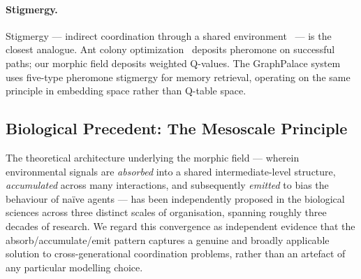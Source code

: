 \documentclass[twoside,11pt]{article}
\begin{document}
\paragraph{Stigmergy.}
Stigmergy --- indirect coordination through a shared
environment~\citep{grasse1959} --- is the closest analogue.  Ant colony
optimization~\citep{dorigo1996} deposits pheromone on successful paths; our
morphic field deposits weighted Q-values.  The GraphPalace
system~\citep{graphpalace2026} uses five-type pheromone stigmergy for memory
retrieval, operating on the same principle in embedding space rather than
Q-table space.

\subsection{Biological Precedent: The Mesoscale Principle}
\label{sec:background:biological}

The theoretical architecture underlying the morphic field --- wherein
environmental signals are \emph{absorbed} into a shared intermediate-level
structure, \emph{accumulated} across many interactions, and subsequently
\emph{emitted} to bias the behaviour of naïve agents --- has been
independently proposed in the biological sciences across three distinct
scales of organisation, spanning roughly three decades of research.  We
regard this convergence as independent evidence that the absorb/accumulate/emit
pattern captures a genuine and broadly applicable solution to cross-generational
coordination problems, rather than an artefact of any particular modelling
choice.
\end{document}
